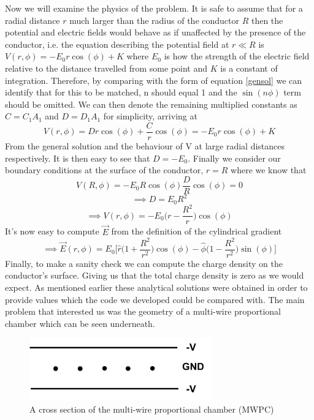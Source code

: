 \documentclass[a4paper]{article}
\begin{document}
Now we will examine the physics of the problem. It is safe to assume that for a 
radial distance $r$ much larger than the radius of the conductor $R$ then the 
potential and electric fields would behave as if unaffected by the presence of 
the conductor, i.e. the equation describing the potential field at $r\ll R$ is 
$V(r,\phi) = -E_0 r\cos(\phi) + K$ where $E_0$ is how the strength of the 
electric field relative to the distance travelled from some point and $K$ is a
constant of integration. Therefore, by comparing with the form of equation
\ref{gensol} we can identify that for this to be matched, n should equal 1 and
the $\sin(n\phi)$ term should be omitted. We can then denote the remaining
multiplied constants as $C = C_1A_1$ and $D=D_1A_1$ for simplicity, arriving at
\begin{equation}V(r,\phi) = Dr\cos(\phi) + \frac{C}{r}\cos(\phi) = -E_0 
r\cos(\phi) + K
\end{equation}
From the general solution and the behaviour of V at large radial distances 
respectively. It is then easy to see that $D = -E_0$. Finally we consider our 
boundary conditions at the surface of the conductor, $r = R$ where we know that
\begin{equation}V(R,\phi) = -E_0R\cos(\phi) \frac{D}{R}\cos(\phi) = 0 
\end{equation}
\begin{equation}\implies D = E_0R^2\end{equation}
\begin{equation}\implies \boxed{V(r,\phi) = -E_0 
\bigg(r-\frac{R^2}{r}\bigg)\cos(\phi)}\end{equation}
It's now easy to compute $\vec{E}$ from the definition of the cylindrical gradient
\begin{equation}\implies \boxed{\vec{E}(r,\phi) = 
E_0\bigg[\hat{r}\bigg(1+\frac{R^2}{r^2}\bigg)\cos(\phi) - 
\hat{\phi}\Big(1-\frac{R^2}{r^2}\Big)\sin(\phi)\bigg]}\end{equation}
Finally, to make a sanity check we can compute the charge density on the 
conductor's surface.
Giving us that the total charge density is zero as we would expect.
As mentioned earlier these analytical solutions were obtained in order to 
provide values which the code we developed could be compared with. The main 
problem that interested us was the geometry of a multi-wire proportional 
chamber which can be seen underneath. 

\begin{figure}[h]
\centering
\includegraphics[width=0.7\textwidth]{NobelProblem.png}
\caption{\label{fig:frog}A cross section of the multi-wire proportional chamber 
(MWPC)}
\end{figure}
\end{document}
